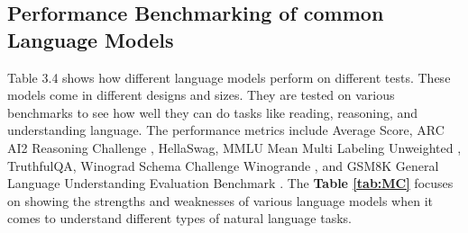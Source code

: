 \subsection{Performance Benchmarking of common Language Models}
Table 3.4 \cite{w12} shows how different language models perform on different tests. These models come in different designs and sizes. They are tested on various benchmarks to see how well they can do tasks like reading, reasoning, and understanding language.
\vskip 0.5cm
The performance metrics include Average Score, ARC AI2 Reasoning Challenge , HellaSwag, MMLU Mean Multi Labeling Unweighted , TruthfulQA, Winograd Schema Challenge Winogrande , and GSM8K General Language Understanding Evaluation Benchmark . The \textbf{Table \ref{tab:MC}} focuses on showing the strengths and weaknesses of various language models when it comes to understand different types of natural language tasks.

